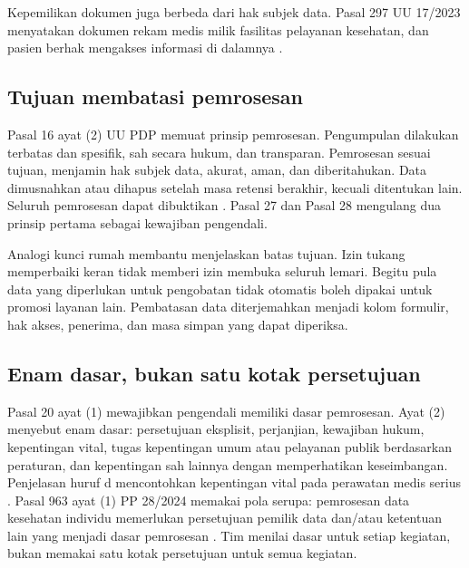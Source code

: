 Kepemilikan dokumen juga berbeda dari hak subjek data. Pasal 297 UU 17/2023 menyatakan dokumen rekam
medis milik fasilitas pelayanan kesehatan, dan pasien berhak mengakses informasi di dalamnya
\cite{c03-uu17}.

\subsection*{Tujuan membatasi pemrosesan}

Pasal 16 ayat (2) UU PDP memuat prinsip pemrosesan. Pengumpulan dilakukan terbatas dan spesifik,
sah secara hukum, dan transparan. Pemrosesan sesuai tujuan, menjamin hak subjek data, akurat, aman,
dan diberitahukan. Data dimusnahkan atau dihapus setelah masa retensi berakhir, kecuali ditentukan
lain. Seluruh pemrosesan dapat dibuktikan \cite{uu27-2022-pdp}. Pasal 27 dan Pasal 28 mengulang dua
prinsip pertama sebagai kewajiban pengendali.

Analogi kunci rumah membantu menjelaskan batas tujuan. Izin tukang memperbaiki keran tidak memberi
izin membuka seluruh lemari. Begitu pula data yang diperlukan untuk pengobatan tidak otomatis boleh
dipakai untuk promosi layanan lain. Pembatasan data diterjemahkan menjadi kolom formulir, hak akses,
penerima, dan masa simpan yang dapat diperiksa.

\subsection*{Enam dasar, bukan satu kotak persetujuan}

Pasal 20 ayat (1) mewajibkan pengendali memiliki dasar pemrosesan. Ayat (2) menyebut enam dasar:
persetujuan eksplisit, perjanjian, kewajiban hukum, kepentingan vital, tugas kepentingan umum atau
pelayanan publik berdasarkan peraturan, dan kepentingan sah lainnya dengan memperhatikan
keseimbangan. Penjelasan huruf d mencontohkan kepentingan vital pada perawatan medis serius
\cite{uu27-2022-pdp}. Pasal 963 ayat (1) PP 28/2024 memakai pola serupa: pemrosesan data kesehatan
individu memerlukan persetujuan pemilik data dan/atau ketentuan lain yang menjadi dasar pemrosesan
\cite{pp28-2024-kesehatan}. Tim menilai dasar untuk setiap kegiatan, bukan memakai satu kotak
persetujuan untuk semua kegiatan.

